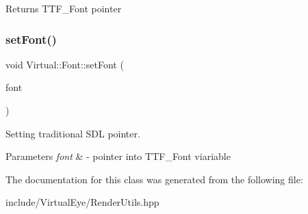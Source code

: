 \begin{DoxyReturn}{Returns}
T\+T\+F\+\_\+\+Font pointer 
\end{DoxyReturn}
\hypertarget{class_virtual_1_1_font_ad0ca95bbe50987aedb3b6efa53ec252b}{}\label{class_virtual_1_1_font_ad0ca95bbe50987aedb3b6efa53ec252b} 
\subsubsection{\texorpdfstring{set\+Font()}{setFont()}}
{\footnotesize\ttfamily void Virtual\+::\+Font\+::set\+Font (\begin{DoxyParamCaption}\item[{T\+T\+F\+\_\+\+Font $\ast$}]{font }\end{DoxyParamCaption})}



Setting traditional S\+DL pointer. 


\begin{DoxyParams}{Parameters}
{\em font} & -\/ pointer into T\+T\+F\+\_\+\+Font viariable \\
\hline
\end{DoxyParams}


The documentation for this class was generated from the following file\+:\begin{DoxyCompactItemize}
\item 
include/\+Virtual\+Eye/Render\+Utils.\+hpp\end{DoxyCompactItemize}
